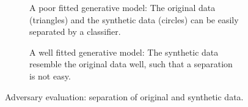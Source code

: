 \begin{figure}%
    \centering%
    \begin{subfigure}[b]{0.49\textwidth}%
        \centering\captionsetup{width=.8\linewidth}%
        \caption{A poor fitted generative model: The original data (triangles) and the synthetic data (circles) can be easily separated by a classifier.}%
        \label{subfig:adversary_evaluation_bad}%
    \end{subfigure}%
    \hfill%
    \begin{subfigure}[b]{0.49\textwidth}%
        \centering\captionsetup{width=.8\linewidth}%
        \caption{A well fitted generative model: The synthetic data resemble the original data well, such that a separation is not easy.}%
        \label{subfig:adversary_evaluation_good}%
    \end{subfigure}%
    \caption{Adversary evaluation: separation of original and synthetic data.}%
    \label{fig:adversary_evaluation}%
\end{figure}%
